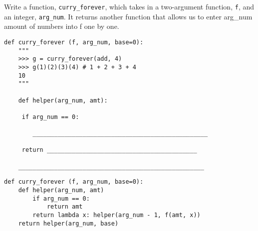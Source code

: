 \begin{blocksection}
\question Write a function, \texttt{curry\_forever}, which takes in a two-argument function, \texttt{f}, and an integer, \texttt{arg\_num}. It returns another function that allows us to enter arg\_num amount of numbers into f one by one.

\begin{lstlisting}
def curry_forever (f, arg_num, base=0):
    """
    >>> g = curry_forever(add, 4)
    >>> g(1)(2)(3)(4) # 1 + 2 + 3 + 4
    10 
    """

    def helper(arg_num, amt):
    
   	 if arg_num == 0:
   	 
   	    _________________________________________________
   	    
   	 return __________________________________________
   	 
    ____________________________________________________

\end{lstlisting}

\begin{solution}
\begin{lstlisting}
def curry_forever (f, arg_num, base=0):
    def helper(arg_num, amt)
   	    if arg_num == 0:
   		    return amt
   	    return lambda x: helper(arg_num - 1, f(amt, x))
    return helper(arg_num, base)

\end{lstlisting}
\end{solution}
\end{blocksection}


